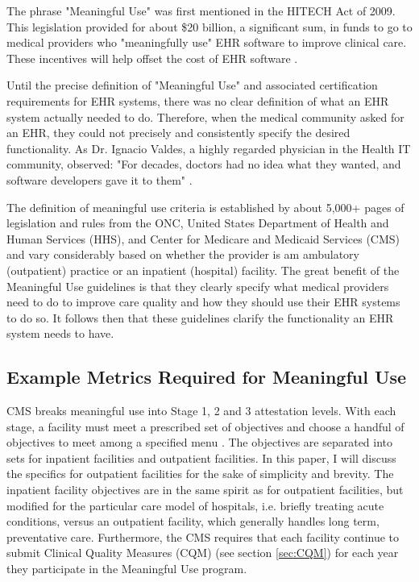 \documentclass[10pt]{article}
\begin{document}
The phrase "Meaningful Use" was first mentioned in the HITECH Act of 2009.
This legislation provided for about \$20 billion, a significant sum, in funds to go to medical providers who "meaningfully use" EHR software to improve clinical care.
These incentives will help offset the cost of EHR software \cite{health-hack}.

Until the precise definition of "Meaningful Use" and associated certification requirements for EHR systems, there was no clear definition of what an EHR system actually needed to do.
Therefore, when the medical community asked for an EHR, they could not precisely and consistently specify the desired functionality.
As Dr. Ignacio Valdes, a highly regarded physician in the Health IT community, observed: "For decades, doctors had no idea what they wanted, and software developers gave it to them" \cite{health-hack}.

The definition of meaningful use criteria is established by about 5,000+ pages of legislation and rules from the ONC, United States Department of Health and Human Services (HHS), and Center for Medicare and Medicaid Services (CMS) and vary considerably based on whether the provider is am ambulatory (outpatient) practice or an inpatient (hospital) facility.
The great benefit of the Meaningful Use guidelines is that they clearly specify what medical providers need to do to improve care quality and how they should use their EHR systems to do so.
It follows then that these guidelines clarify the functionality an EHR system needs to have.

\subsection{Example Metrics Required for Meaningful Use}
\label{sec:Meaningful Use Metrics}

CMS breaks meaningful use into Stage 1, 2 and 3 attestation levels.
With each stage, a facility must meet a prescribed set of objectives and choose a handful of objectives to meet among a specified menu \cite{cms-stage1}.
The objectives are separated into sets for inpatient facilities and outpatient facilities.
In this paper, I will discuss the specifics for outpatient facilities for the sake of simplicity and brevity.
The inpatient facility objectives are in the same spirit as for outpatient facilities, but modified for the particular care model of hospitals, i.e. briefly treating acute conditions, versus an outpatient facility, which generally handles long term, preventative care.
Furthermore, the CMS requires that each facility continue to submit Clinical Quality Measures (CQM) (see section \ref{sec:CQM}) for each year they participate in the Meaningful Use program.
\end{document}
